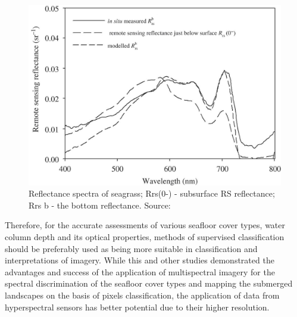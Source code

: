 \documentclass[10pt, a4paper]{article}
\begin{document}
\begin{figure}
	\centering
	\includegraphics[scale=0.15]{Fig-15.jpg}
	\caption{Reflectance spectra of seagrass; Rrs(0-) - subsurface RS reflectance; Rrs b - the bottom
		reflectance. Source:\cite{Yang10}\label{Yang10}}
	\label{fig:15}
\end{figure}

Therefore, for the accurate assessments of various seafloor cover types, water
column depth and its optical properties, methods of supervised classification should be preferably
used as being more suitable in classification and interpretations of imagery.
While this and other studies \cite{Phinn08}\label{Phinn08}demonstrated the advantages and success of the
application of multispectral imagery for the spectral discrimination of the seafloor cover types and
mapping the submerged landscapes on the basis of pixels classification, the application of data from
hyperspectral sensors has better potential due to their higher resolution.
\end{document}

